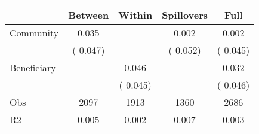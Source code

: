 
\begin{tabular}{l*{4}{c}}\hline&\multicolumn{1}{c}{Between}&\multicolumn{1}{c}{Within}&\multicolumn{1}{c}{Spillovers}&\multicolumn{1}{c}{Full}\\ \hline
 Community             &              0.035      &                                               &        0.002 &         0.002                            \\ 
                               &        (       0.047)           &                                       &       (       0.052)     &      (       0.045)                                           \\ 
 Beneficiary   &                                               &        0.046    &                                &             0.032                            \\ 
                               &                                               & (       0.045)                  &                                        &      (       0.046)                                           \\ 
\hline                                                                                                                                                                                                                                            
 Obs                   &               2097               &       1913                       &       1360                &              2686                                               \\ 
 R2                    &                      0.005              &              0.002                      &              0.007               &                     0.003                                              \\ 
\hline \end{tabular}                                                                                                                                                                                                              